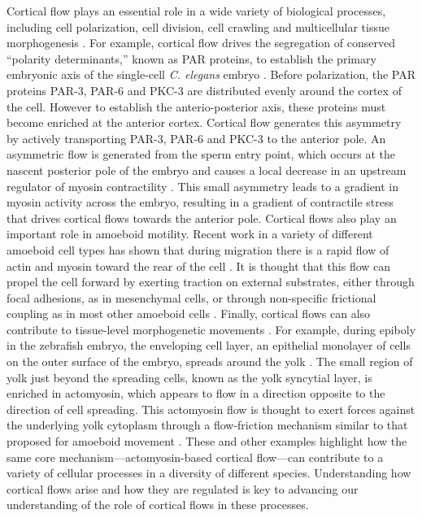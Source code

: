 Cortical flow plays an essential role in a wide variety of biological processes, including  cell polarization, cell division, cell crawling and multicellular tissue morphogenesis \cite{cellmech_flows3, cellmech_flows2, Benink:2000aa, Wilson:2010aa, Rauzi2010, Munro2004413}. For example, cortical flow drives the segregation of conserved  “polarity determinants,” known as PAR proteins, to establish the primary embryonic axis of the single-cell \textit{C. elegans} embryo \cite{Munro2004413,Goehring1208619}. Before polarization, the PAR proteins PAR-3, PAR-6 and PKC-3 are distributed evenly around the cortex of the cell. However to establish the anterio-posterior axis, these proteins must become enriched at the anterior cortex. Cortical flow generates this asymmetry by actively transporting PAR-3, PAR-6 and PKC-3 to the anterior pole. An asymmetric flow is generated from the sperm entry point, which occurs at the nascent posterior pole of the embryo and causes a local decrease in an upstream regulator of myosin contractility \cite{Munro2004413,motegi}. This small asymmetry leads to a gradient in myosin activity across the embryo, resulting in a gradient of contractile stress  \cite{cellmech_flows, cellmech_flows3} that drives cortical flows towards the anterior pole. Cortical flows also play an important role in amoeboid motility. Recent work in a variety of different amoeboid cell types has shown that during migration there is a rapid flow of actin and myosin toward the rear of the cell \cite{amoeba1, amoeba2, amoeba3, amoeba4, Yumura200}. It is thought that this flow can propel the cell forward by exerting traction on external substrates, either through focal adhesions, as in mesenchymal cells, or through non-specific frictional coupling as in most other amoeboid cells \cite{amoeba1}. Finally, cortical flows can also contribute to tissue-level morphogenetic movements \cite{Salbreux2012536,Munjal1789}.  For example, during epiboly in the zebrafish embryo, the enveloping cell layer, an epithelial monolayer of cells on the outer surface of the embryo, spreads around the yolk \cite{epib_review}.  The small region of yolk just beyond the spreading cells, known as the yolk syncytial layer, is enriched in actomyosin, which appears to flow in a direction opposite to the direction of cell spreading. This actomyosin flow is thought to exert forces against the underlying yolk cytoplasm through a flow-friction mechanism similar to that proposed for amoeboid movement \cite{Behrndt257}. These and other examples highlight how the same core mechanism---actomyosin-based cortical flow---can contribute to a variety of cellular processes in a diversity of different species. Understanding how cortical flows arise and how they are regulated is key to advancing our understanding of the role of cortical flows in these processes.

